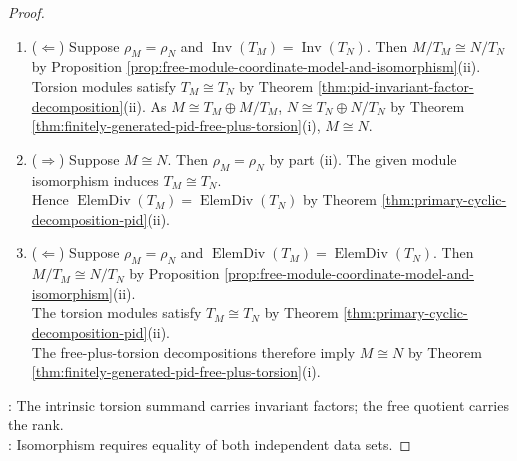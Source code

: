 \begin{corollary}
\begin{proof}
\begin{enumerate}[label=(\roman*)]
\item[$(ii)$] ($\Leftarrow$) Suppose $\rho_M=\rho_N$ and $\operatorname{Inv}(T_M)=\operatorname{Inv}(T_N)$. Then $M/T_M\cong N/T_N$ by Proposition \ref{prop:free-module-coordinate-model-and-isomorphism}(ii).\\
Torsion modules satisfy $T_M\cong T_N$ by Theorem \ref{thm:pid-invariant-factor-decomposition}(ii). As $M\cong T_M\oplus M/T_M$, $N\cong T_N\oplus N/T_N$ by Theorem \ref{thm:finitely-generated-pid-free-plus-torsion}(i), $M\cong N$.
\item[$(iii)$] ($\Rightarrow$) Suppose $M\cong N$. Then $\rho_M=\rho_N$ by part (ii). The given module isomorphism induces $T_M\cong T_N$.\\
Hence $\operatorname{ElemDiv}(T_M)=\operatorname{ElemDiv}(T_N)$ by Theorem \ref{thm:primary-cyclic-decomposition-pid}(ii).
\item[$(iii)$] ($\Leftarrow$) Suppose $\rho_M=\rho_N$ and $\operatorname{ElemDiv}(T_M)=\operatorname{ElemDiv}(T_N)$. Then $M/T_M\cong N/T_N$ by Proposition \ref{prop:free-module-coordinate-model-and-isomorphism}(ii).\\
The torsion modules satisfy $T_M\cong T_N$ by Theorem \ref{thm:primary-cyclic-decomposition-pid}(ii).\\
The free-plus-torsion decompositions therefore imply $M\cong N$ by Theorem \ref{thm:finitely-generated-pid-free-plus-torsion}(i).
\end{enumerate}
\noindent
{}: The intrinsic torsion summand carries invariant factors; the free quotient carries the rank.\\
: Isomorphism requires equality of both independent data sets.
\end{proof}
\end{corollary}

